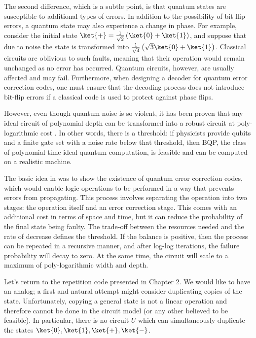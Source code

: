 \documentclass[12pt,a4paper]{article}
\begin{document}
The second difference, which is a subtle point, is that quantum states are susceptible to additional types of errors. In addition to the possibility of bit-flip errors, a quantum state may also experience a change in phase. For example, consider the initial state $\ket{+} = \frac{1}{\sqrt{2}}\left( \ket{0} + \ket{1} \right)$, and suppose that due to noise the state is transformed into $\frac{1}{\sqrt{4}}\left( \sqrt{3}\ket{0} + \ket{1} \right)$. Classical circuits are oblivious to such faults, meaning that their operation would remain unchanged as no error has occurred. Quantum circuits, however, are usually affected and may fail. Furthermore, when designing a decoder for quantum error correction codes, one must ensure that the decoding process does not introduce bit-flip errors if a classical code is used to protect against phase flips.

 

However, even though quantum noise is so violent, it has been proven that any ideal circuit of polynomial depth can be transformed into a robust circuit at poly-logarithmic cost \cite{aharonov1999faulttolerant}. In other words, there is a threshold: if physicists provide qubits and a finite gate set with a noise rate below that threshold, then BQP, the class of polynomial-time ideal quantum computation, is feasible and can be computed on a realistic machine.


The basic idea in \cite{aharonov1999faulttolerant} was to show the existence of quantum error correction codes, which would enable logic operations to be performed in a way that prevents errors from propagating. This process involves separating the operation into two stages: the operation itself and an error correction stage. This comes with an additional cost in terms of space and time, but it can reduce the probability of the final state being faulty. The trade-off between the resources needed and the rate of decrease defines the threshold. If the balance is positive, then the process can be repeated in a recursive manner, and after log-log iterations, the failure probability will decay to zero. At the same time, the circuit will scale to a maximum of poly-logarithmic width and depth.


Let's return to the repetition code presented in Chapter 2. We would like to have an analog; a first and natural attempt might consider duplicating copies of the state. Unfortunately, copying a general state is not a linear operation and therefore cannot be done in the circuit model (or any other believed to be feasible). In particular, there is no circuit $U$ which can simultaneously duplicate the states $\ket{0}, \ket{1}, \ket{+}, \ket{-}$.
\end{document}
